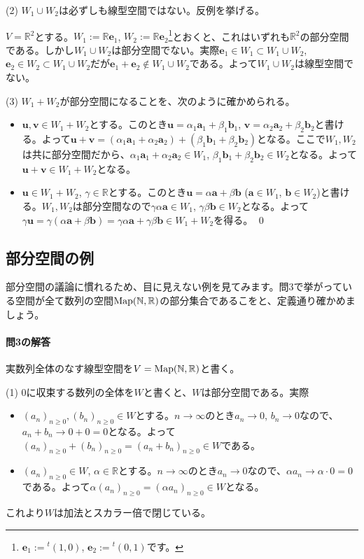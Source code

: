 \noindent (2) $W_1\cup W_2$は必ずしも線型空間ではない。反例を挙げる。

$V = \mathbb{R}^2$とする。$W_1 := \mathbb{R}\bm{e}_1$, $W_2 := \mathbb{R}\bm{e}_2$\footnote{$\bm{e}_1 := {}^t(1,0)$, $\bm{e}_2 := {}^t(0,1)$です。}とおくと、これはいずれも$\mathbb{R}^2$の部分空間である。しかし$W_1 \cup W_2$は部分空間でない。実際$\bm{e}_1\in W_1 \subset W_1 \cup W_2$, $\bm{e}_2\in W_2 \subset W_1 \cup W_2$だが$\bm{e}_1 + \bm{e}_2 \not\in W_1\cup W_2$である。よって$W_1\cup W_2$は線型空間でない。

\noindent (3) $W_1 + W_2$が部分空間になることを、次のように確かめられる。
\begin{itemize}
\item $\bm{u}, \bm{v}\in W_1 +  W_2$とする。このとき$\bm{u} = \alpha_1 \bm{a}_1 + \beta_1 \bm{b}_1$, $\bm{v} = \alpha_2 \bm{a}_2 + \beta_2 \bm{b}_2$と書ける。よって$\bm{u} + \bm{v} = (\alpha_1 \bm{a}_1 + \alpha_2 \bm{a}_2) + (\beta_1 \bm{b}_1 + \beta_2 \bm{b}_2)$となる。ここで$W_1, W_2$は共に部分空間だから、$\alpha_1 \bm{a}_1 + \alpha_2 \bm{a}_2 \in W_1$, $\beta_1 \bm{b}_1 + \beta_2 \bm{b}_2 \in W_2$となる。よって$\bm{u} + \bm{v} \in W_1 +  W_2$となる。
\item $\bm{u}\in W_1 +  W_2$, $\gamma\in\mathbb{R}$とする。このとき$\bm{u} = \alpha\bm{a} + \beta\bm{b}$ ($\bm{a} \in W_1$, $\bm{b} \in W_2$)と書ける。$W_1, W_2$は部分空間なので$\gamma\alpha\bm{a} \in W_1$, $\gamma\beta\bm{b} \in W_2$となる。よって$\gamma\bm{u} = \gamma(\alpha\bm{a} + \beta\bm{b}) = \gamma\alpha\bm{a} + \gamma\beta\bm{b}\in W_1 +  W_2$を得る。 \qed
\end{itemize}

\subsection{部分空間の例}

部分空間の議論に慣れるため、目に見えない例を見てみます。問$3$で挙がっている空間が全て数列の空間$\operatorname{Map}(\mathbb{N}, \mathbb{R})$の部分集合であるこをと、定義通り確かめましょう。

\paragraph{問3の解答} 実数列全体のなす線型空間を$V=\operatorname{Map}(\mathbb{N}, \mathbb{R})$と書く。

\noindent (1) $0$に収束する数列の全体を$W$と書くと、$W$は部分空間である。実際
\begin{itemize}
\item $(a_n)_{n \geq 0}, (b_n)_{n \geq 0}\in W$とする。$n\rightarrow\infty$のとき$a_n\rightarrow 0$, $b_n\rightarrow 0$なので、$a_n + b_n \rightarrow 0 + 0 = 0$となる。よって$(a_n)_{n \geq 0} + (b_n)_{n \geq 0} = (a_n + b_n)_{n \geq 0}\in W$である。
\item $(a_n)_{n \geq 0}\in W$, $\alpha\in\mathbb{R}$とする。$n\rightarrow\infty$のとき$a_n \rightarrow 0$なので、$\alpha a_n \rightarrow \alpha \cdot 0 = 0$である。よって$\alpha (a_n)_{n \geq 0} = (\alpha a_n)_{n \geq 0}\in W$となる。
\end{itemize}
これより$W$は加法とスカラー倍で閉じている。


